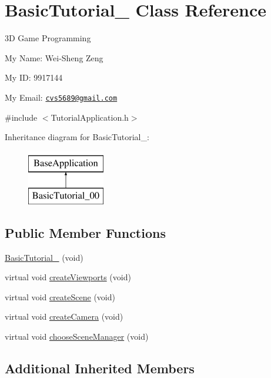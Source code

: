 \hypertarget{class_basic_tutorial__00}{\section{Basic\-Tutorial\-\_ Class Reference}
\label{class_basic_tutorial__00}
}


3\-D Game Programming \par
 My Name\-: Wei-\/\-Sheng Zeng \par
 My I\-D\-: 9917144 \par
 My Email\-: \href{mailto:cvs5689@gmail.com}{\tt cvs5689@gmail.\-com}  




{\ttfamily \#include $<$Tutorial\-Application.\-h$>$}

Inheritance diagram for Basic\-Tutorial\-\_\-:\begin{figure}[H]
\begin{center}
\leavevmode
\includegraphics[height=2.382979cm]{class_basic_tutorial__00}
\end{center}
\end{figure}
\subsection*{Public Member Functions}
\begin{DoxyCompactItemize}
\item 
\hyperlink{class_basic_tutorial__00_a6b55068822076b28e7819b1878e95684}{Basic\-Tutorial\-\_} (void)
\item 
virtual void \hyperlink{class_basic_tutorial__00_adc2454d9f8226e0958ecf702f355846e}{create\-Viewports} (void)
\item 
virtual void \hyperlink{class_basic_tutorial__00_a15a3d4673724ec99077ce992f996a550}{create\-Scene} (void)
\item 
virtual void \hyperlink{class_basic_tutorial__00_a1bf709417d654dffc2ea10987412b912}{create\-Camera} (void)
\item 
virtual void \hyperlink{class_basic_tutorial__00_aba97a29d983586d2dc8e108d3bccf721}{choose\-Scene\-Manager} (void)
\end{DoxyCompactItemize}
\subsection*{Additional Inherited Members}


